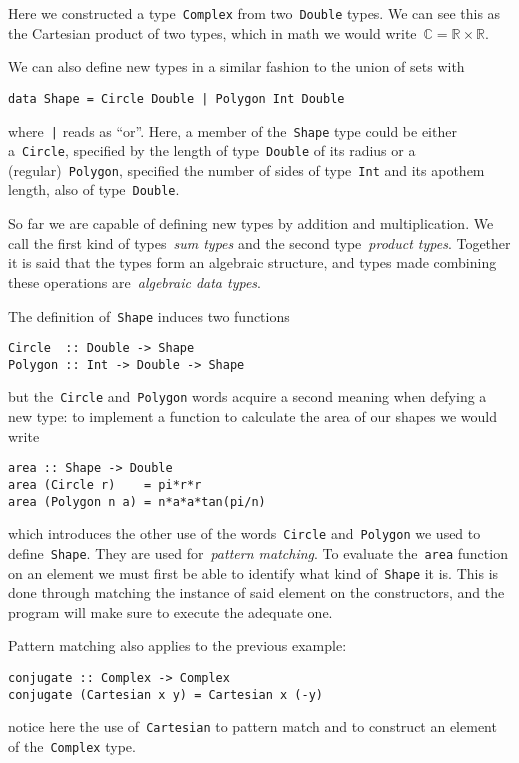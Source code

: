 \documentclass[a4paper]{article}
\theoremstyle{plain}
\theoremstyle{definition}
\begin{document}
Here we constructed a type~\texttt{Complex} from
two~\texttt{Double} types. We can see this as the Cartesian product
of two types, which in math we would
write~\(\mathbb{C}=\mathbb{R}\times\mathbb{R}\).

We can also define new types in a similar fashion to the union of sets with
\begin{verbatim}
data Shape = Circle Double | Polygon Int Double
\end{verbatim}
where~\texttt{|} reads as ``or''. Here, a member of
the~\texttt{Shape} type could be either
a~\texttt{Circle}, specified by the length of
type~\texttt{Double} of its radius or a
(regular)~\texttt{Polygon}, specified the number of sides of
type~\texttt{Int} and its apothem length, also of
type~\texttt{Double}.

So far we are capable of defining new types by addition and multiplication. We
call the first kind of types~\emph{sum types} and the second type~\emph{product
types}. Together it is said that the types form an algebraic structure, and
types made combining these operations are~\emph{algebraic data types}.

The definition of~\texttt{Shape} induces two functions
\begin{verbatim}
Circle  :: Double -> Shape
Polygon :: Int -> Double -> Shape
\end{verbatim}
but the~\texttt{Circle} and~\texttt{Polygon} words
acquire a second meaning when defying a new type: to implement a function to
calculate the area of our shapes we would write
\begin{verbatim}
area :: Shape -> Double
area (Circle r)    = pi*r*r
area (Polygon n a) = n*a*a*tan(pi/n)
\end{verbatim}
which introduces the other use of the words~\texttt{Circle}
and~\texttt{Polygon} we used to define~\texttt{Shape}.
They are used for~\emph{pattern matching}. To evaluate
the~\texttt{area} function on an element we must
first be able to identify what kind of~\texttt{Shape} it is. This
is done through matching the instance of said element on the constructors, and
the program will make sure to execute the adequate one.

Pattern matching also applies to the previous example:
\begin{verbatim}
conjugate :: Complex -> Complex
conjugate (Cartesian x y) = Cartesian x (-y)
\end{verbatim}
notice here the use of~\texttt{Cartesian} to pattern match and to
construct an element of the~\texttt{Complex} type.
\end{document}

